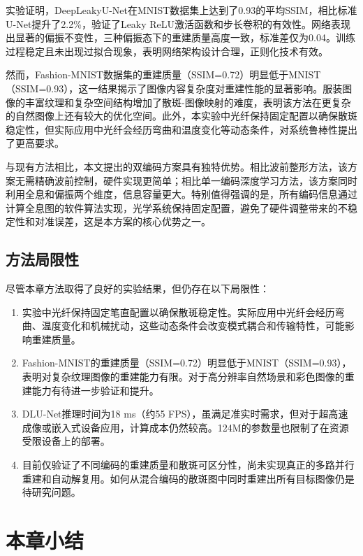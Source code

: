 {实验证明，DeepLeakyU-Net在MNIST数据集上达到了0.93的平均SSIM，相比标准U-Net提升了2.2\%，验证了Leaky ReLU激活函数和步长卷积的有效性。网络表现出显著的偏振不变性，三种偏振态下的重建质量高度一致，标准差仅为0.04。训练过程稳定且未出现过拟合现象，表明网络架构设计合理，正则化技术有效。

然而，Fashion-MNIST数据集的重建质量（SSIM=0.72）明显低于MNIST（SSIM=0.93），这一结果揭示了图像内容复杂度对重建性能的显著影响。服装图像的丰富纹理和复杂空间结构增加了散斑-图像映射的难度，表明该方法在更复杂的自然图像上还有较大的优化空间。此外，本实验中光纤保持固定配置以确保散斑稳定性，但实际应用中光纤会经历弯曲和温度变化等动态条件，对系统鲁棒性提出了更高要求。

与现有方法相比，本文提出的双编码方案具有独特优势。相比波前整形方法，该方案无需精确波前控制，硬件实现更简单；相比单一编码深度学习方法，该方案同时利用全息和偏振两个维度，信息容量更大。特别值得强调的是，所有编码信息通过计算全息图的软件算法实现，光学系统保持固定配置，避免了硬件调整带来的不稳定性和对准误差，这是本方案的核心优势之一。

\subsection{方法局限性}\label{sec:limitations}

尽管本章方法取得了良好的实验结果，但仍存在以下局限性：

\begin{enumerate}
    \item 实验中光纤保持固定笔直配置以确保散斑稳定性。实际应用中光纤会经历弯曲、温度变化和机械扰动，这些动态条件会改变模式耦合和传输特性，可能影响重建质量。
    
    \item Fashion-MNIST的重建质量（SSIM=0.72）明显低于MNIST（SSIM=0.93），表明对复杂纹理图像的重建能力有限。对于高分辨率自然场景和彩色图像的重建能力有待进一步验证和提升。
    
    \item DLU-Net推理时间为18 ms（约55 FPS），虽满足准实时需求，但对于超高速成像或嵌入式设备应用，计算成本仍然较高。124M的参数量也限制了在资源受限设备上的部署。
    
    \item 目前仅验证了不同编码的重建质量和散斑可区分性，尚未实现真正的多路并行重建和自动解复用。如何从混合编码的散斑图中同时重建出所有目标图像仍是待研究问题。
\end{enumerate}


\section{本章小结}\label{sec:method_summary}

}
